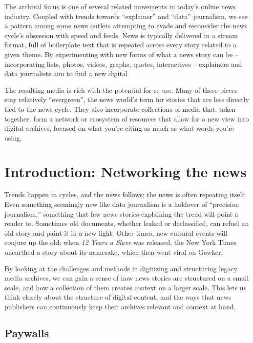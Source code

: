 The archival focus is one of several related movements in today's online news industry. Coupled with trends towards ``explainer'' and ``data'' journalism, we see a pattern among some news outlets attempting to evade and reconsider the news cycle's obsession with speed and feeds. News is typically delivered in a stream format, full of boilerplate text that is repeated across every story related to a given theme. By experimenting with new forms of what a news story can be -- incorporating lists, photos, videos, graphs, quotes, interactives -- explainers and data journalists aim to find a new digital

The resulting media is rich with the potential for re-use. Many of these pieces stay relatively ``evergreen'', the news world's term for stories that are less directly tied to the news cycle. They also incorporate collections of media that, taken together, form a network or ecosystem of resources that allow for a new view into digital archives, focused on what you're citing as much as what words you're using.

\section{Introduction: Networking the news}

Trends happen in cycles, and the news follows; the news is often repeating itself. Even something seemingly new like data journalism is a holdover of ``precision journalism,'' something that few news stories explaining the trend will point a reader to. Sometimes old documents, whether leaked or declassified, can refuel an old story and paint it in a new light. Other times, new cultural events will conjure up the old; when \emph{12 Years a Slave} was released, the New York Times unearthed a story about its namesake, which then went viral on Gawker.

By looking at the challenges and methods in digitizing and structuring legacy media archives, we can gain a sense of how news stories are structured on a small scale, and how a collection of them creates context on a larger scale. This lets us think closely about the structure of digital content, and the ways that news publishers can continuously keep their archives relevant and context at hand.

\subsection{Paywalls}

